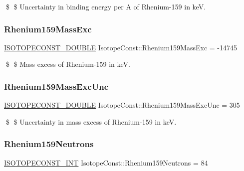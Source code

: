 \$ \$ Uncertainty in binding energy per A of Rhenium-\/159 in keV. \mbox{\label{group___isotope_const-_rhenium-_re159_gab5ec3f631fa1417c10af7a8ce599bf4b}} 
\subsubsection{\texorpdfstring{Rhenium159\+Mass\+Exc}{Rhenium159MassExc}}
{\footnotesize\ttfamily \mbox{\hyperlink{group___isotope_const-_macros_ga8f45a7272ce02c0b4c65c44636ed719a}{I\+S\+O\+T\+O\+P\+E\+C\+O\+N\+S\+T\+\_\+\+D\+O\+U\+B\+LE}} Isotope\+Const\+::\+Rhenium159\+Mass\+Exc = -\/14745}

\$ \$ Mass excess of Rhenium-\/159 in keV. \mbox{\label{group___isotope_const-_rhenium-_re159_ga724f5299a905141cb4ecc0c8baa2f7b9}} 
\subsubsection{\texorpdfstring{Rhenium159\+Mass\+Exc\+Unc}{Rhenium159MassExcUnc}}
{\footnotesize\ttfamily \mbox{\hyperlink{group___isotope_const-_macros_ga8f45a7272ce02c0b4c65c44636ed719a}{I\+S\+O\+T\+O\+P\+E\+C\+O\+N\+S\+T\+\_\+\+D\+O\+U\+B\+LE}} Isotope\+Const\+::\+Rhenium159\+Mass\+Exc\+Unc = 305}

\$ \$ Uncertainty in mass excess of Rhenium-\/159 in keV. \mbox{\label{group___isotope_const-_rhenium-_re159_gad1632569fda2a7efb8cc717202b8b507}} 
\subsubsection{\texorpdfstring{Rhenium159\+Neutrons}{Rhenium159Neutrons}}
{\footnotesize\ttfamily \mbox{\hyperlink{group___isotope_const-_macros_ga5f18360b3e99483a35c32d789e62621c}{I\+S\+O\+T\+O\+P\+E\+C\+O\+N\+S\+T\+\_\+\+I\+NT}} Isotope\+Const\+::\+Rhenium159\+Neutrons = 84}

